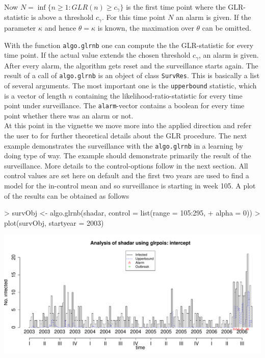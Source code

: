 \documentclass[a4paper,11pt]{article}
\begin{document}
Now $N=\inf \{n \geq 1 : GLR(n) \geq c_{\gamma} \}$ is the first time point where the GLR-statistic is above a threshold $c_{\gamma}$. For this time point $N$ an alarm is given. If the parameter $\kappa$ and hence $\theta=\kappa$ is known, the maximation over $\theta$ can be omitted.

With the function \verb+algo.glrnb+ one can compute the the GLR-statistic for every time point. If the actual value extends the chosen threshold $c_{\gamma}$, an alarm is given. After every alarm, the algorithm gets reset and the surveillance starts again. The result of a call of \verb+algo.glrnb+ is an object of class \verb+SurvRes+. This is basically a list of several arguments. The most important one is the \verb+upperbound+ statistic, which is a vector of length $n$ containing the likelihood-ratio-statistic for every time point under surveillance. The \verb+alarm+-vector contains a boolean for every time point whether there was an alarm or not. \\ 
 

At this point in the vignette we move more into the applied direction and refer the user to \citet{hoehle2008} for further theoretical details about the GLR procedure. The next example demonstrates the surveillance with the \verb+algo.glrnb+ in a learning by doing type of way. The example should demonstrate primarily the result of the surveillance. More details to the control-options follow in the next section. All control values are set here on default and the first two years are used to find a model for the in-control mean and so surveillance is starting in week 105. A plot of the results can be obtained as follows

\begin{Schunk}
\begin{Sinput}
> survObj <- algo.glrnb(shadar, control = list(range = 105:295, 
+     alpha = 0))
> plot(survObj, startyear = 2003)
\end{Sinput}
\end{Schunk}
\includegraphics{figs/vignette_glrnb-005}
\end{document}
